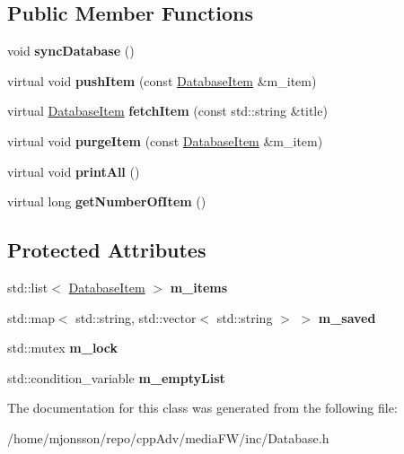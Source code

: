 \subsection*{Public Member Functions}
\begin{DoxyCompactItemize}
\item 
\mbox{\label{classDatabase_ac77c61314a54bf3bc1bcbcf7986998e8}} 
void {\bfseries sync\+Database} ()
\item 
\mbox{\label{classDatabase_a80fa14ab9f4deadc9a2ab7493f1919a4}} 
virtual void {\bfseries push\+Item} (const \hyperlink{classDatabaseItem}{Database\+Item} \&m\+\_\+item)
\item 
\mbox{\label{classDatabase_a40254eec69c7d7cc15da24a9f0b072b3}} 
virtual \hyperlink{classDatabaseItem}{Database\+Item} {\bfseries fetch\+Item} (const std\+::string \&title)
\item 
\mbox{\label{classDatabase_a5d232b9f62079682dd7fe7983b252e5e}} 
virtual void {\bfseries purge\+Item} (const \hyperlink{classDatabaseItem}{Database\+Item} \&m\+\_\+item)
\item 
\mbox{\label{classDatabase_afa345da530fd5c8dfe0c978917cd6049}} 
virtual void {\bfseries print\+All} ()
\item 
\mbox{\label{classDatabase_a230225cb341eb23a99a83ef3d1abae53}} 
virtual long {\bfseries get\+Number\+Of\+Item} ()
\end{DoxyCompactItemize}
\subsection*{Protected Attributes}
\begin{DoxyCompactItemize}
\item 
\mbox{\label{classDatabase_a5a4ac1f3bf0f5fd77a696174ad9e5c45}} 
std\+::list$<$ \hyperlink{classDatabaseItem}{Database\+Item} $>$ {\bfseries m\+\_\+items}
\item 
\mbox{\label{classDatabase_a9f87cbe5a1be71d541083dffa8d8c9ad}} 
std\+::map$<$ std\+::string, std\+::vector$<$ std\+::string $>$ $>$ {\bfseries m\+\_\+saved}
\item 
\mbox{\label{classDatabase_a7f55f3a5d93c9694ee4f08a2f2135b1d}} 
std\+::mutex {\bfseries m\+\_\+lock}
\item 
\mbox{\label{classDatabase_a2ad8bf38964b3e18a0e168437acbdb27}} 
std\+::condition\+\_\+variable {\bfseries m\+\_\+empty\+List}
\end{DoxyCompactItemize}


The documentation for this class was generated from the following file\+:\begin{DoxyCompactItemize}
\item 
/home/mjonsson/repo/cpp\+Adv/media\+F\+W/inc/Database.\+h\end{DoxyCompactItemize}
